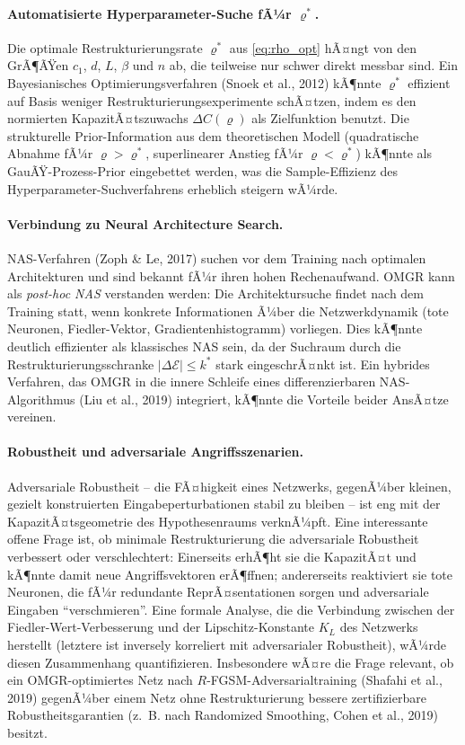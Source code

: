 ﻿\documentclass[12pt, a4paper, openany]{report}
\newcommand{\calE}{\mathcal{E}}
\begin{document}
\paragraph{Automatisierte Hyperparameter-Suche fÃ¼r $\varrho^*$.}
Die optimale Restrukturierungsrate $\varrho^*$ aus \eqref{eq:rho_opt}
hÃ¤ngt von den GrÃ¶ÃŸen $c_1$, $d$, $L$, $\beta$ und $n$ ab, die
teilweise nur schwer direkt messbar sind.  Ein Bayesianisches
Optimierungsverfahren (Snoek et al., 2012) kÃ¶nnte $\varrho^*$ effizient
auf Basis weniger Restrukturierungsexperimente schÃ¤tzen, indem es den
normierten KapazitÃ¤tszuwachs $\Delta C(\varrho)$ als Zielfunktion
benutzt.  Die strukturelle Prior-Information aus dem theoretischen Modell
(quadratische Abnahme fÃ¼r $\varrho > \varrho^*$, superlinearer Anstieg
fÃ¼r $\varrho < \varrho^*$) kÃ¶nnte als GauÃŸ-Prozess-Prior eingebettet
werden, was die Sample-Effizienz des Hyperparameter-Suchverfahrens
erheblich steigern wÃ¼rde.

\paragraph{Verbindung zu Neural Architecture Search.}
NAS-Verfahren (Zoph \& Le, 2017) suchen vor dem Training nach optimalen
Architekturen und sind bekannt fÃ¼r ihren hohen Rechenaufwand.  OMGR
kann als \emph{post-hoc NAS} verstanden werden: Die Architektursuche
findet nach dem Training statt, wenn konkrete Informationen Ã¼ber die
Netzwerkdynamik (tote Neuronen, Fiedler-Vektor, Gradientenhistogramm)
vorliegen.  Dies kÃ¶nnte deutlich effizienter als klassisches NAS sein,
da der Suchraum durch die Restrukturierungsschranke $|\Delta\calE| \leq k^*$
stark eingeschrÃ¤nkt ist.  Ein hybrides Verfahren, das OMGR in die innere
Schleife eines differenzierbaren NAS-Algorithmus (Liu et al., 2019)
integriert, kÃ¶nnte die Vorteile beider AnsÃ¤tze vereinen.

\paragraph{Robustheit und adversariale Angriffsszenarien.}
Adversariale Robustheit -- die FÃ¤higkeit eines Netzwerks, gegenÃ¼ber
kleinen, gezielt konstruierten Eingabeperturbationen stabil zu bleiben --
ist eng mit der KapazitÃ¤tsgeometrie des Hypothesenraums verknÃ¼pft.
Eine interessante offene Frage ist, ob minimale Restrukturierung die
adversariale Robustheit verbessert oder verschlechtert: Einerseits erhÃ¶ht
sie die KapazitÃ¤t und kÃ¶nnte damit neue Angriffsvektoren erÃ¶ffnen;
andererseits reaktiviert sie tote Neuronen, die fÃ¼r redundante ReprÃ¤sentationen
sorgen und adversariale Eingaben ``verschmieren''.  Eine formale Analyse,
die die Verbindung zwischen der Fiedler-Wert-Verbesserung und der
Lipschitz-Konstante $K_L$ des Netzwerks herstellt (letztere ist inversely
korreliert mit adversarialer Robustheit), wÃ¼rde diesen Zusammenhang
quantifizieren.  Insbesondere wÃ¤re die Frage relevant, ob ein OMGR-optimiertes
Netz nach $R$-FGSM-Adversarialtraining (Shafahi et al., 2019) gegenÃ¼ber
einem Netz ohne Restrukturierung bessere zertifizierbare Robustheitsgarantien
(z.~B. nach Randomized Smoothing, Cohen et al., 2019) besitzt.
\end{document}
